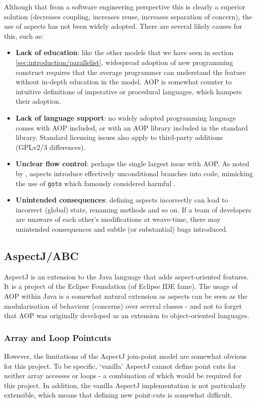 	Although that from a software engineering perspective this is clearly a superior solution (decreases coupling, increases reuse, increases separation of concern), the use of aspects has not been widely adopted. There are several likely causes for this, such as:
	
	\begin{itemize}
		\item \textbf{Lack of education}: like the other models that we have seen in section \ref{sec:introduction/parallelist}, widespread adoption of new programming construct requires that the average programmer can understand the feature without in-depth education in the model. AOP is somewhat counter to intuitive definitions of imperative or procedural languages, which hampers their adoption.
		\item \textbf{Lack of language support}: no widely adopted programming language comes with AOP included, or with an AOP library included in the standard library. Standard licensing issues also apply to third-party additions (\eg GPLv2/3 differences).
		\item \textbf{Unclear flow control}: perhaps the single largest issue with AOP. As noted by \citet{Constantinides2004}, aspects introduce effectively unconditional branches into code, mimicking the use of \texttt{goto} which \citeauthor{Dijkstra1968} famously considered harmful \citep{Dijkstra1968}.
		\item \textbf{Unintended consequences}: defining aspects incorrectly can lead to incorrect (global) state, \eg renaming methods and so on. If a team of developers are unaware of each other's modifications at weave-time, there may unintended consequences and subtle (or substantial) bugs introduced.
	\end{itemize}
	
	\subsection{AspectJ/ABC} \label{sec:instrumentation/aop/aspectj}
	AspectJ \citep{Kiczales2001} is an extension to the Java language that adds aspect-oriented features. It is a project of the Eclipse Foundation (of Eclipse IDE fame). The usage of AOP within Java is a somewhat natural extension as aspects can be seen as the modularisation of behaviour (concerns) over several classes - and not to forget that AOP was originally developed as an extension to object-oriented languages.
		
		\subsubsection{Array and Loop Pointcuts} \label{sec:instrumentation/aop/aspectj/arrayloop}
		However, the limitations of the AspectJ join-point model are somewhat obvious for this project. To be specific, `vanilla' AspectJ cannot define point cuts for neither array accesses or loops - a combination of which would be required for this project. In addition, the vanilla AspectJ implementation is not particularly extensible, which means that defining new point-cuts is somewhat difficult.
		
